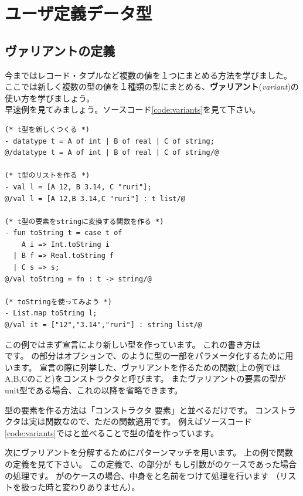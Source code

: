 \documentclass[11pt,a4paper]{jarticle}
\begin{document}
\section{ユーザ定義データ型}
\subsection{ヴァリアントの定義}

今まではレコード・タプルなど複数の値を１つにまとめる方法を学びました。
ここでは新しく複数の型の値を１種類の型にまとめる、\textbf{ヴァリアント}(\textit{variant})の使い方を学びましょう。\\
早速例を見てみましょう。ソースコード\ref{code:variants}を見て下さい。

\begin{lstlisting}[caption=単純なヴァリアント,label=code:variants]
(* t型を新しくつくる *)
- datatype t = A of int | B of real | C of string;
@/datatype t = A of int | B of real | C of string/@

(* t型のリストを作る *)
- val l = [A 12, B 3.14, C "ruri"];
@/val l = [A 12,B 3.14,C "ruri"] : t list/@

(* t型の要素をstringに変換する関数を作る *)
- fun toString t = case t of
    A i => Int.toString i
  | B f => Real.toString f
  | C s => s;
@/val toString = fn : t -> string/@

(* toStringを使ってみよう *)
- List.map toString l;
@/val it = ["12","3.14","ruri"] : string list/@
\end{lstlisting}

この例ではまず宣言により新しい型を作っています。
これの書き方は\\です。
の部分はオプションで、のように型の一部をパラメータ化するために用います。
宣言の際に列挙した、ヴァリアントを作るための関数(上の例ではA,B,Cのこと)をコンストラクタと呼びます。
またヴァリアントの要素の型がunit型である場合、これの以降を省略できます。

型の要素を作る方法は「コンストラクタ 要素」と並べるだけです。
コンストラクタは実は関数なので、ただの関数適用です。
例えばソースコード\ref{code:variants}ではと並べることで型の値を作っています。

次にヴァリアントを分解するためにパターンマッチを用います。
上の例で関数の定義を見て下さい。
この定義で、の部分が
もし引数がのケースであった場合の処理です。
がのケースの場合、中身をと名前をつけて処理を行います
（リストを扱った時と変わりありません）。
\end{document}
